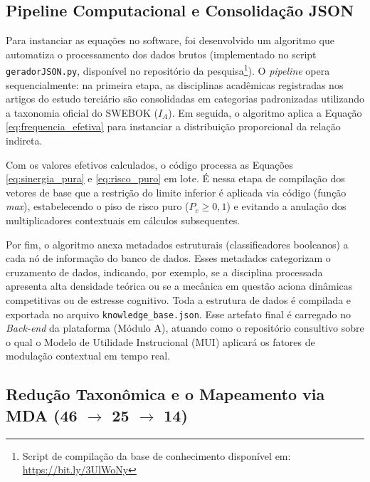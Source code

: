 \subsection{Pipeline Computacional e Consolidação JSON}

Para instanciar as equações no software, foi desenvolvido um algoritmo que automatiza o processamento dos dados brutos (implementado no script \texttt{geradorJSON.py}, disponível no repositório da pesquisa\footnote{Script de compilação da base de conhecimento disponível em: \url{https://bit.ly/3UlWoNy}}). O \textit{pipeline} opera sequencialmente: na primeira etapa, as disciplinas acadêmicas registradas nos artigos do estudo terciário são consolidadas em categorias padronizadas utilizando a taxonomia oficial do SWEBOK ($I_A$). Em seguida, o algoritmo aplica a Equação \ref{eq:frequencia_efetiva} para instanciar a distribuição proporcional da relação indireta.

Com os valores efetivos calculados, o código processa as Equações \ref{eq:sinergia_pura} e \ref{eq:risco_puro} em lote. É nessa etapa de compilação dos vetores de base que a restrição do limite inferior é aplicada via código (função \textit{max}), estabelecendo o piso de risco puro ($P_c \ge 0,1$) e evitando a anulação dos multiplicadores contextuais em cálculos subsequentes.

Por fim, o algoritmo anexa metadados estruturais (classificadores booleanos) a cada nó de informação do banco de dados. Esses metadados categorizam o cruzamento de dados, indicando, por exemplo, se a disciplina processada apresenta alta densidade teórica ou se a mecânica em questão aciona dinâmicas competitivas ou de estresse cognitivo. Toda a estrutura de dados é compilada e exportada no arquivo \texttt{knowledge\_base.json}. Esse artefato final é carregado no \textit{Back-end} da plataforma (Módulo A), atuando como o repositório consultivo sobre o qual o Modelo de Utilidade Instrucional (MUI) aplicará os fatores de modulação contextual em tempo real.


\subsection{Redução Taxonômica e o Mapeamento via MDA (46 $\to$ 25 $\to$ 14)}
\label{subsec:MDA}


